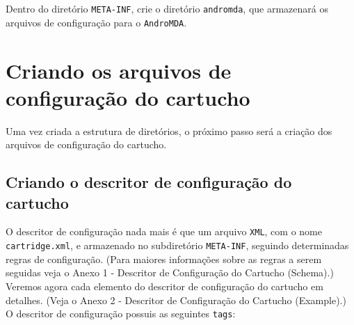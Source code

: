 Dentro do diretório \texttt{META-INF}, crie o diretório \texttt{andromda}, que
armazenará os arquivos de configuração para o \texttt{AndroMDA}.

\section{Criando os arquivos de configuração do cartucho}
Uma vez criada a estrutura de diretórios, o próximo passo será a criação dos
arquivos de configuração do cartucho. 

\subsection{Criando o descritor de configuração do cartucho}
O descritor de configuração nada mais é que um arquivo \texttt{XML}, com o nome
\texttt{cartridge.xml},  e armazenado no subdiretório \texttt{META-INF}, 
seguindo determinadas regras de configuração. (Para maiores informações sobre as
regras a serem seguidas veja o Anexo 1 - Descritor de Configuração do Cartucho
(Schema).) Veremos agora cada elemento do descritor de configuração do cartucho
em detalhes. (Veja o Anexo 2 - Descritor de Configuração do Cartucho (Example).)
O descritor de configuração possuis as seguintes \texttt{tags}:

